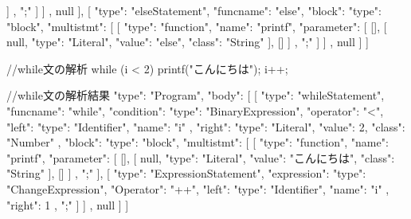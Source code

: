 {{{{                        ]
                     },
                     ";"
                  ]
               ]
            }
         },
         null
      ],
      [
         {
            "type": "elseStatement",
            "funcname": "else",
            "block": {
               "type": "block",
               "multistmt": [
                  [
                     {
                        "type": "function",
                        "name": "printf",
                        "parameter": [
                           [],
                           [
                              null,
                              {
                                 "type": "Literal",
                                 "value": "else",
                                 "class": "String"
                              }
                           ],
                           []
                        ]
                     },
                     ";"
                  ]
               ]
            }
         },
         null
      ]
   ]
}

//while文の解析
while (i < 2){
  printf("こんにちは\n");
  i++;
}

//while文の解析結果
{
   "type": "Program",
   "body": [
      [
         {
            "type": "whileStatement",
            "funcname": "while",
            "condition": {
               "type": "BinaryExpression",
               "operator": "<",
               "left": {
                  "type": "Identifier",
                  "name": "i"
               },
               "right": {
                  "type": "Literal",
                  "value": 2,
                  "class": "Number"
               }
            },
            "block": {
               "type": "block",
               "multistmt": [
                  [
                     {
                        "type": "function",
                        "name": "printf",
                        "parameter": [
                           [],
                           [
                              null,
                              {
                                 "type": "Literal",
                                 "value": "こんにちは\n",
                                 "class": "String"
                              }
                           ],
                           []
                        ]
                     },
                     ";"
                  ],
                  [
                     {
                        "type": "ExpressionStatement",
                        "expression": {
                           "type": "ChangeExpression",
                           "Operator": "++",
                           "left": {
                              "type": "Identifier",
                              "name": "i"
                           },
                           "right": 1
                        }
                     },
                     ";"
                  ]
               ]
            }
         },
         null
      ]
   ]
}
